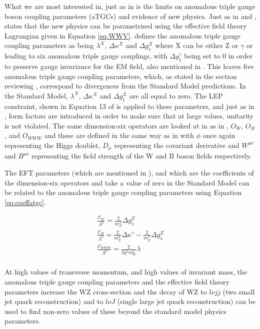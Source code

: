 \documentclass[11pt,oneside,a4paper]{article}
\begin{document}
What we are most interested in, just as in \cite{WWtgc} is the limits on anomalous triple gauge boson coupling parameters (aTGCs) and evidence of new physics. Just as in \cite{WWtgc} and \cite{higgsdata}, \cite{WV} states that the new physics can be parametrised using the effective field theory Lagrangian given in Equation \ref{eq:WWV}. \cite{WV} defines the anomalous triple gauge coupling parameters as being $\lambda^{X}$, $\Delta\kappa^{X}$ and $\Delta g^{X}_{1}$ where X can be either Z or $\gamma$ or leading to six anomalous triple gauge couplings, with $\Delta g_{1}^{\gamma}$ being set to 0 in order to preserve gauge invariance for the EM field, also mentioned in \cite{WWtgc}. This leaves five anomalous triple gauge coupling parameters, which, as stated in the section reviewing \cite{WWtgc}, correspond to divergences from the Standard Model predictions. In the Standard Model,  $\lambda^{X}$, $\Delta\kappa^{X}$ and $\Delta g^{X}_{1}$ are all equal to zero. The LEP constraint, shown in Equation 13 of \cite{WWtgc} is applied to these parameters, and just as in \cite{WWtgc}, form factors are introduced in order to make sure that at large values, unitarity is not violated. The same dimension-six operators are looked at in \cite{WV} as in \cite{WWtgc}, $O_{W}$, $O_{B}$, and $O_{WWW}$ and these are defined in the same way as in \cite{WWtgc} with $\phi$ once again representing the Higgs doublet, $D_{\mu}$ representing the covariant derivative and $W^{\mu\nu}$ and $B^{\mu\nu}$ representing the field strength of the W and B boson fields respectively. 

The EFT parameters (which are mentioned in \cite{WWtgc}), and which are the coefficients of the dimension-six operators and take a value of zero in the Standard Model can be related to the anomalous triple gauge coupling parameters using Equation \ref{eq:coeffatgc}.


\begin{equation}
\label{eq:coeffatgc}
\begin{aligned}
\frac{\mathcal{C}_{W}}{\Lambda^{2}} = \frac{2}{m^{2}_{Z}}\Delta g_{1}^{Z}\\
\frac{\mathcal{C}_{B}}{\Lambda^{2}} = \frac{2}{m^{2}_{Z}}\Delta\kappa^{\gamma} - \frac{2}{m^{2}_{Z}}\Delta g_{1}^{Z}\\
\frac{\mathcal{C}_{WWW}}{\Lambda^{2}} = \frac{2}{3g^{2}m^{2}_{W}}\lambda\\
\end{aligned}
\end{equation}

At high values of transverse momentum, and high values of invariant mass, the anomalous triple gauge coupling parameters and the effective field theory parameters increase the WZ cross-section and the decay of WZ to $l \nu jj$ (two small jet quark reconstruction) and to $l\nu J$ (single large jet quark reconstruction) can be used to find non-zero values of these beyond the standard model physics parameters.
\end{document}
